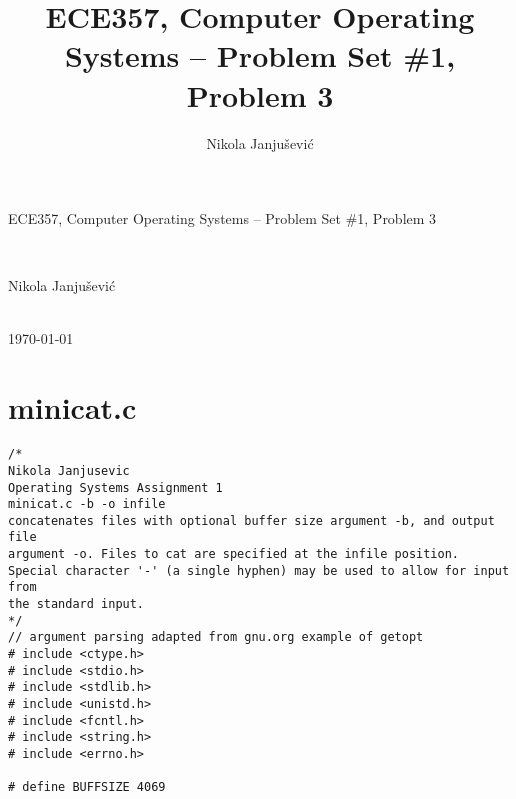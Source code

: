 \documentclass[10pt,a4paper]{article}
\author{Nikola Janju\v{s}evi\'{c}}
\title{ECE357, Computer Operating Systems -- Problem Set \#1, Problem 3}
\begin{document}
\begin{Large}
ECE357, Computer Operating Systems -- Problem Set \#1, Problem 3
\end{Large} \\
\begin{large}
Nikola Janju\v{s}evi\'{c}
\end{large} 
\\
\today

\section*{minicat.c}
\begin{verbatim}
/*
Nikola Janjusevic
Operating Systems Assignment 1
minicat.c -b -o infile
concatenates files with optional buffer size argument -b, and output file
argument -o. Files to cat are specified at the infile position.
Special character '-' (a single hyphen) may be used to allow for input from
the standard input.
*/
// argument parsing adapted from gnu.org example of getopt
# include <ctype.h>
# include <stdio.h>
# include <stdlib.h>
# include <unistd.h>
# include <fcntl.h>
# include <string.h>
# include <errno.h>

# define BUFFSIZE 4069


\end{verbatim}
\end{document}
